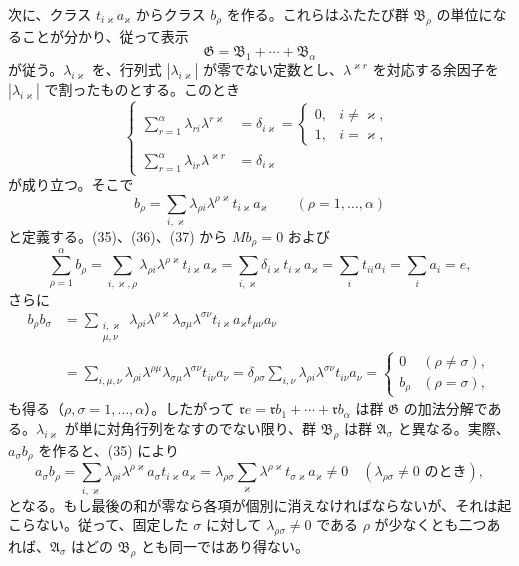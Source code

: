 \documentclass[11pt]{article}
\begin{document}
次に、クラス $t_{i\varkappa}a_\varkappa$ からクラス $b_\rho$ を作る。これらはふたたび群 $\mathfrak B_\rho$ の単位になることが分かり、従って表示
\[
 \mathfrak G=\mathfrak B_1+\cdots+\mathfrak B_\alpha
\]
が従う。$\lambda_{i\varkappa}$ を、行列式 $|\lambda_{i\varkappa}|$ が零でない定数とし、$\lambda^{\varkappa r}$ を対応する余因子を $|\lambda_{i\varkappa}|$ で割ったものとする。このとき
\begin{equation}
\left\{
\begin{aligned}
 \sum_{r=1}^{\alpha}\lambda_{ri}\lambda^{r\varkappa}&=\delta_{i\varkappa}=\begin{cases}0,&i\ne\varkappa,\\1,&i=\varkappa,
 \end{cases}\\
 \sum_{r=1}^{\alpha}\lambda_{ir}\lambda^{\varkappa r}&=\delta_{i\varkappa}
\end{aligned}\right.
\tag{36}
\end{equation}
が成り立つ。そこで
\begin{equation}
 b_\rho=\sum_{i,\varkappa}\lambda_{\rho i}\lambda^{\rho\varkappa}t_{i\varkappa}a_\varkappa
 \qquad(\rho=1,
\ldots,\alpha)
\tag{37}
\end{equation}
と定義する。(35)、(36)、(37) から $Mb_\rho=0$ および
\begin{equation}
 \sum_{\rho=1}^{\alpha}b_\rho
 =\sum_{i,\varkappa,\rho}\lambda_{\rho i}\lambda^{\rho\varkappa}t_{i\varkappa}a_\varkappa
 =\sum_{i,\varkappa}\delta_{i\varkappa}t_{i\varkappa}a_\varkappa
 =\sum_i t_{ii}a_i=\sum_i a_i=e,
\tag{38}
\end{equation}
さらに
\[
\begin{aligned}
 b_\rho b_\sigma
 &=\sum_{\substack{i,\varkappa\\ \mu,\nu}}
  \lambda_{\rho i}\lambda^{\rho\varkappa}\lambda_{\sigma\mu}\lambda^{\sigma\nu}
  t_{i\varkappa}a_\varkappa t_{\mu\nu}a_\nu \\
 &=\sum_{i,\mu,\nu}\lambda_{\rho i}\lambda^{\rho\mu}\lambda_{\sigma\mu}\lambda^{\sigma\nu}t_{i\nu}a_\nu
 =\delta_{\rho\sigma}\sum_{i,\nu}\lambda_{\rho i}\lambda^{\sigma\nu}t_{i\nu}a_\nu
 =\begin{cases}0&(\rho\ne\sigma),\\ b_\rho&(\rho=\sigma),\end{cases}
\end{aligned}
\]
も得る（$\rho,\sigma=1,\ldots,\alpha$）。したがって $\mathfrak r e=\mathfrak r b_1+\cdots+\mathfrak r b_\alpha$ は群 $\mathfrak G$ の加法分解である。$\lambda_{i\varkappa}$ が単に対角行列をなすのでない限り、群 $\mathfrak B_\rho$ は群 $\mathfrak A_\sigma$ と異なる。実際、$a_\sigma b_\rho$ を作ると、(35) により
\[
 a_\sigma b_\rho
 =\sum_{i,\varkappa}\lambda_{\rho i}\lambda^{\rho\varkappa}a_\sigma t_{i\varkappa}a_\varkappa
 =\lambda_{\rho\sigma}
 \sum_\varkappa\lambda^{\rho\varkappa}t_{\sigma\varkappa}a_\varkappa\ne0
 \quad(\lambda_{\rho\sigma}\ne0\text{ のとき}),
\]
となる。もし最後の和が零なら各項が個別に消えなければならないが、それは起こらない。従って、固定した $\sigma$ に対して $\lambda_{\rho\sigma}\ne0$ である $\rho$ が少なくとも二つあれば、$\mathfrak A_\sigma$ はどの $\mathfrak B_\rho$ とも同一ではあり得ない。
\end{document}
